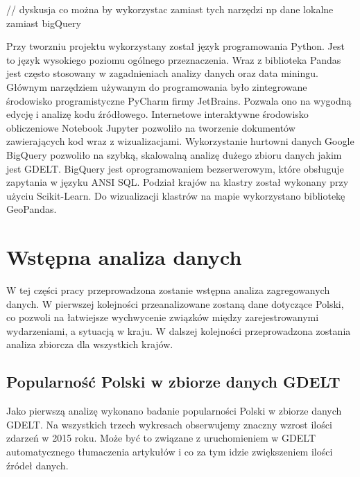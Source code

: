 \documentclass[11pt]{report}
\begin{document}
    // dyskusja co można by wykorzystac zamiast tych narzędzi np dane lokalne zamiast bigQuery

    Przy tworzniu projektu wykorzystany został język programowania Python.
    Jest to język wysokiego poziomu ogólnego przeznaczenia.
    Wraz z biblioteka Pandas jest często stosowany w zagadnieniach analizy danych oraz data miningu.
    Głównym narzędziem używanym do programowania było zintegrowane środowisko programistyczne PyCharm firmy JetBrains.
    Pozwala ono na wygodną edycję i analizę kodu źródłowego.
    Internetowe interaktywne środowisko obliczeniowe Notebook Jupyter pozwoliło na tworzenie dokumentów zawierających kod wraz z wizualizacjami.
    Wykorzystanie hurtowni danych Google BigQuery pozwoliło na szybką, skalowalną analizę dużego zbioru danych jakim jest GDELT.
    BigQuery jest oprogramowaniem bezserwerowym, które obsługuje zapytania w języku ANSI SQL.
    Podział krajów na klastry został wykonany przy użyciu Scikit-Learn.
    Do wizualizacji klastrów na mapie wykorzystano bibliotekę GeoPandas.


    \section{Wstępna analiza danych}
    W tej części pracy przeprowadzona zostanie wstępna analiza zagregowanych danych. W pierwszej kolejności przeanalizowane zostaną dane dotyczące Polski, co pozwoli na łatwiejsze wychwycenie związków między zarejestrowanymi wydarzeniami, a sytuacją w kraju.
    W dalszej kolejności przeprowadzona zostania analiza zbiorcza dla wszystkich krajów.

    \subsection{Popularność Polski w zbiorze danych GDELT}
    Jako pierwszą analizę wykonano badanie popularności Polski w zbiorze danych GDELT. Na wszystkich trzech wykresach obserwujemy znaczny wzrost ilości zdarzeń w 2015 roku. Może być to związane z uruchomieniem w GDELT automatycznego tłumaczenia artykułów i co za tym idzie zwiększeniem ilości źródeł danych.
\end{document}
